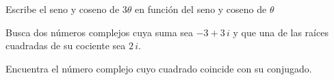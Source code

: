 \vspace{-10mm}
\begin{flushright}
\begin{footnotesize} \textcolor{gris}{}	\end{footnotesize}
\end{flushright}


\begin{mipropuesto}

Escribe el seno y coseno de $3\theta$ en función del seno y coseno de $\theta$
\end{mipropuesto}

\vspace{-8mm}
\begin{flushright}
\begin{footnotesize} \textcolor{gris}{}	\end{footnotesize}
\end{flushright}





\vspace{-8mm}
\begin{flushright}
\begin{footnotesize} \textcolor{gris}{}	\end{footnotesize}
\end{flushright}


\begin{mipropuesto}

Busca dos números complejos cuya suma sea $-3 + 3\, i$ y que una de las raíces cuadradas de su cociente sea $2\, i$.
\end{mipropuesto}

\vspace{-8mm}
\begin{flushright}
\begin{footnotesize} \textcolor{gris}{}	\end{footnotesize}
\end{flushright}


\begin{mipropuesto}

Encuentra el número complejo cuyo cuadrado coincide con su conjugado.
\end{mipropuesto}

